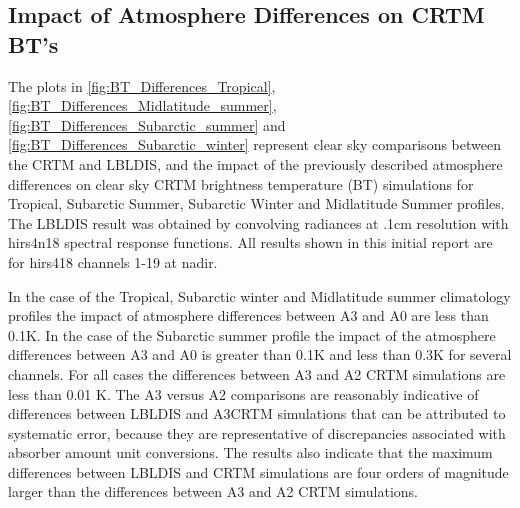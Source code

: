 

\subsection{Impact of Atmosphere Differences on CRTM BT's}

The plots in \ref{fig:BT_Differences_Tropical}, \ref{fig:BT_Differences_Midlatitude_summer}, \ref{fig:BT_Differences_Subarctic_summer} and \ref{fig:BT_Differences_Subarctic_winter} 
represent clear sky comparisons between the CRTM and LBLDIS, and the impact of the previously described atmosphere differences on clear sky CRTM brightness temperature (BT) simulations for Tropical, Subarctic Summer, Subarctic Winter and Midlatitude Summer profiles. The LBLDIS result was obtained by convolving radiances at .1cm resolution with hirs4\textunderscore{}n18 spectral response functions. All results shown in this initial report are for hirs4\textunderscore{}18 channels 1-19 at nadir.

In the case of the Tropical, Subarctic winter and Midlatitude summer climatology profiles the impact of atmosphere differences between A3 and A0 are less than 0.1K. In the case of the Subarctic summer profile the impact of the atmosphere differences between A3 and A0 is greater than 0.1K and less than 0.3K for several channels. For all cases the differences between A3 and A2 CRTM simulations are less than 0.01 K. The A3 versus A2 comparisons are reasonably indicative of differences between LBLDIS and A3\textunderscore{}CRTM simulations that can be attributed to systematic error, because they are representative of discrepancies associated with absorber amount unit conversions. The results also indicate that the maximum differences between LBLDIS and CRTM simulations are four orders of magnitude larger than the differences between A3 and A2 CRTM simulations. 




%
%
%
%

